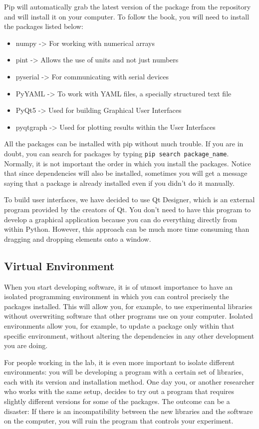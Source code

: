 Pip will automatically grab the latest version of the package from the repository and will install it on your computer. To follow the book, you will need to install the packages listed below:
\begin{itemize}
 \item numpy -> For working with numerical arrays
 \item pint -> Allows the use of units and not just numbers
 \item pyserial -> For communicating with serial devices
 \item PyYAML -> To work with YAML files, a specially structured text file
 \item PyQt5 -> Used for building Graphical User Interfaces
 \item pyqtgraph -> Used for plotting results within the User Interfaces
\end{itemize}

All the packages can be installed with pip without much trouble. If you are in doubt, you can search for packages by typing \texttt{pip search package_name}. Normally, it is not important the order in which you install the packages. Notice that since dependencies will also be installed, sometimes you will get a message saying that a package is already installed even if you didn't do it manually. 

To build user interfaces, we have decided to use Qt Designer, which is an external program provided by the creators of Qt. You don't need to have this program to develop a graphical application because you can do everything directly from within Python. However, this approach can be much more time consuming than dragging and dropping elements onto a window.

\subsection{Virtual Environment}
When you start developing software, it is of utmost importance to have an isolated programming environment in which you can control precisely the packages installed. This will allow you, for example, to use experimental libraries without overwriting software that other programs use on your computer. Isolated environments allow you, for example, to update a package only within that specific environment, without altering the dependencies in any other development you are doing.

For people working in the lab, it is even more important to isolate different environments: you will be developing a program with a certain set of libraries, each with its version and installation method. One day you, or another researcher who works with the same setup, decides to try out a program that requires slightly different versions for some of the packages. The outcome can be a disaster: If there is an incompatibility between the new libraries and the software on the computer, you will ruin the program that controls your experiment.

